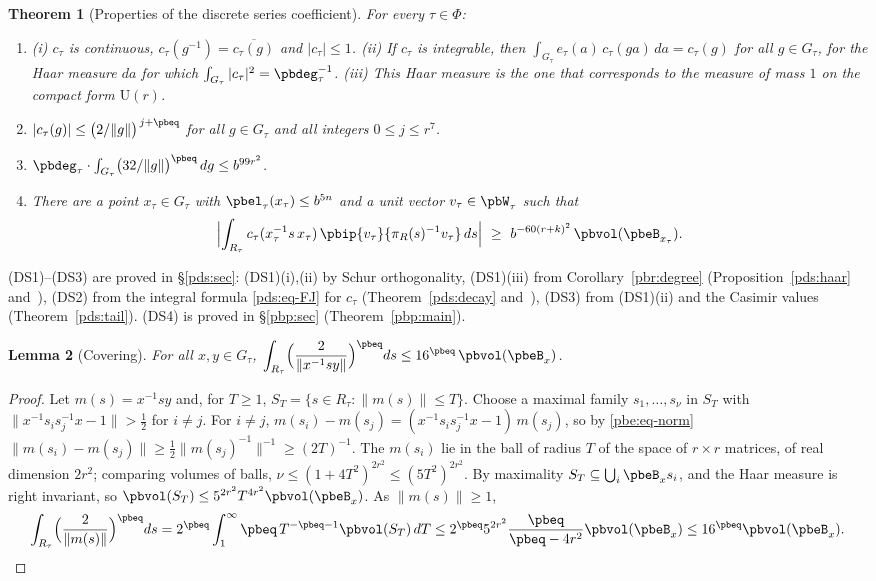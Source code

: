 \documentclass[10pt]{amsart}
\newtheorem{theorem}{Theorem}[section]
\newtheorem{lemma}[theorem]{Lemma}
\theoremstyle{definition}
\theoremstyle{remark}
\providecommand{\auPl}{\Phi}
\providecommand{\auU}{\mathrm U}
\providecommand{\aubar}[1]{\overline{#1}}
\begin{document}
\begin{theorem}[Properties of the discrete series coefficient]\label{pbe:ds}
For every $\tau\in\auPl$:
\begin{enumerate}
\item[(DS1)] \textup{(i)} $c_\tau$ is continuous, $c_\tau(g^{-1})=\aubar{c_\tau(g)}$ and $|c_\tau|
\le1$. \textup{(ii)} If $c_\tau$ is integrable, then $\int_{G_\tau}e_\tau(a)\,c_\tau(ga)\,da=c_\tau(g)$
for all $g\in G_\tau$, for the Haar measure $da$ for which $\int_{G_\tau}|c_\tau|^2=\pbdeg_\tau^{-1}$.
\textup{(iii)} This Haar measure is the one that corresponds to the measure of mass $1$ on the
compact form $\auU(r)$.
\item[(DS2)] $|c_\tau(g)|\le\bigl(2/\|g\|\bigr)^{\,j+\pbeq}$ for all $g\in G_\tau$ and all integers
$0\le j\le r^7$.
\item[(DS3)] $\pbdeg_\tau\cdot\int_{G_\tau}\bigl(32/\|g\|\bigr)^{\pbeq}\,dg\le b^{99r^2}$.
\item[(DS4)] There are a point $x_\tau\in G_\tau$ with $\pbel_\tau(x_\tau)\le b^{5n}$ and a unit
vector $v_\tau\in\pbW_\tau$ such that
\[
\Bigl|\int_{R_\tau}c_\tau(x_\tau^{-1}s\,x_\tau)\,\pbip{v_\tau}{\pi_R(s)^{-1}v_\tau}\,ds\Bigr|\ \ge\
b^{-60(r+k)^2}\,\pbvol(\pbeB_{x_\tau}).
\]
\end{enumerate}
\end{theorem}
\smallskip\noindent\textup{(DS1)}--\textup{(DS3)} are proved in \S\ref{pds:sec}: \textup{(DS1)(i),(ii)} by Schur orthogonality, \textup{(DS1)(iii)} from Corollary~\ref{pbr:degree} (Proposition~\ref{pds:haar} and~{\cite[Proposition~2.19]{P49}}), \textup{(DS2)} from the integral formula \eqref{pds:eq-FJ} for $c_\tau$ (Theorem~\ref{pds:decay} and~{\cite[Theorem~3.17]{P49}}), \textup{(DS3)} from \textup{(DS1)(ii)} and the Casimir values (Theorem~\ref{pds:tail}). \textup{(DS4)} is proved in \S\ref{pbp:sec} (Theorem~\ref{pbp:main}).\par\smallskip

\begin{lemma}[Covering]\label{pbe:cover}
For all $x,y\in G_\tau$, $\displaystyle\int_{R_\tau}\Bigl(\frac2{\|x^{-1}sy\|}\Bigr)^{\pbeq}ds\le16^{
\pbeq}\,\pbvol(\pbeB_x)$.
\end{lemma}
\begin{proof}
Let $m(s)=x^{-1}sy$ and, for $T\ge1$, $S_T=\{s\in R_\tau:\|m(s)\|\le T\}$. Choose a maximal family
$s_1,\dots,s_\nu$ in $S_T$ with $\|x^{-1}s_is_j^{-1}x-1\|>\frac12$ for $i\ne j$. For $i\ne j$,
$m(s_i)-m(s_j)=(x^{-1}s_is_j^{-1}x-1)\,m(s_j)$, so by \eqref{pbe:eq-norm} $\|m(s_i)-m(s_j)\|\ge
\frac12\|m(s_j)^{-1}\|^{-1}\ge(2T)^{-1}$. The $m(s_i)$ lie in the ball of radius $T$ of the space of
$r\times r$ matrices, of real dimension $2r^2$; comparing volumes of balls, $\nu\le(1+4T^2)^{2r^2}
\le(5T^2)^{2r^2}$. By maximality $S_T\subseteq\bigcup_i\pbeB_x s_i$, and the Haar measure is right
invariant, so $\pbvol(S_T)\le5^{2r^2}T^{4r^2}\pbvol(\pbeB_x)$. As $\|m(s)\|\ge1$,
\[
\int_{R_\tau}\Bigl(\frac2{\|m(s)\|}\Bigr)^{\pbeq}ds=2^{\pbeq}\int_1^\infty\pbeq\,T^{-\pbeq-1}\pbvol
(S_T)\,dT\le2^{\pbeq}5^{2r^2}\frac{\pbeq}{\pbeq-4r^2}\pbvol(\pbeB_x)\le16^{\pbeq}\pbvol(\pbeB_x).
\qedhere
\]
\end{proof}
\end{document}
